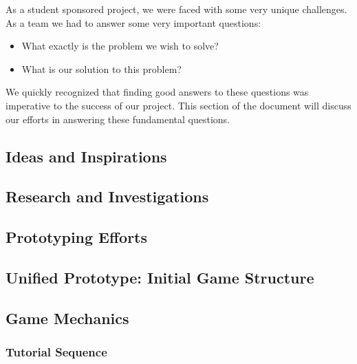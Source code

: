 As a student sponsored project, we were faced with some very unique
challenges. As a team we had to answer some very important questions:

\begin{itemize}
    \item What exactly is the problem we wish to solve?
    \item What is our solution to this problem?
\end{itemize}

We quickly recognized that finding good answers to these questions was imperative to the success of our project.
This section of the document will discuss our efforts in answering these fundamental questions.

\subsection{Ideas and Inspirations}
  
\newpage

\subsection{Research and Investigations}
  
\newpage

\subsection{Prototyping Efforts}
  
\newpage

\subsection{Unified Prototype: Initial Game Structure}
\newpage

\subsection{Game Mechanics}
\subsubsection{Tutorial Sequence}
\label{section:tutorial}
  
\newpage
